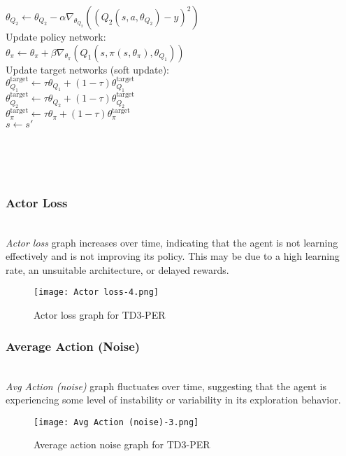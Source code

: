 \documentclass[preprint,12pt]{elsarticle}
\begin{document}
\begin{algorithm}[!htbp]
\begin{algorithmic}
            \STATE \quad $\theta_{Q_2} \leftarrow \theta_{Q_2} - \alpha \nabla_{\theta_{Q_2}} \left((Q_2(s, a, \theta_{Q_2}) - y)^2\right)$\\
            \STATE Update policy network:\\
            \STATE \quad $\theta_\pi \leftarrow \theta_\pi + \beta \nabla_{\theta_\pi} \left(Q_1(s, \pi(s, \theta_\pi), \theta_{Q_1})\right)$\\
            \STATE Update target networks (soft update):\\
            \STATE \quad $\theta_{Q_1}^{\text{target}} \leftarrow \tau \theta_{Q_1} + (1 - \tau) \theta_{Q_1}^{\text{target}}$\\
            \STATE \quad $\theta_{Q_2}^{\text{target}} \leftarrow \tau \theta_{Q_2} + (1 - \tau) \theta_{Q_2}^{\text{target}}$\\
            \STATE \quad $\theta_\pi^{\text{target}} \leftarrow \tau \theta_\pi + (1 - \tau) \theta_\pi^{\text{target}}$\\
            \STATE $s \leftarrow s'$\\
        \ENDFOR\\
    \ENDFOR\\
\end{algorithmic}
\end{algorithm}\\

\subsubsection{Actor Loss}\\
\textit{Actor loss} graph increases over time, indicating that the agent is not learning effectively and is not improving its policy. This may be due to a high learning rate, an unsuitable architecture, or delayed rewards.
\graphicspath{ {./images/} }
\begin{figure}[!htbp]
  \centering
  \texttt{[image: Actor loss-4.png]}
  \caption{Actor loss graph for TD3-PER}
  \label{fig:actor-loss-4}
\end{figure}


\subsubsection{Average Action (Noise)}\\
\textit{Avg Action (noise)} graph fluctuates over time, suggesting that the agent is experiencing some level of instability or variability in its exploration behavior.
\graphicspath{ {./images/} }
\begin{figure}[!htbp]
  \centering
  \texttt{[image: Avg Action (noise)-3.png]}
  \caption{Average action noise graph for TD3-PER}
  \label{fig:avg-action-noise-3}
\end{figure}
\\
\\
\end{document}

